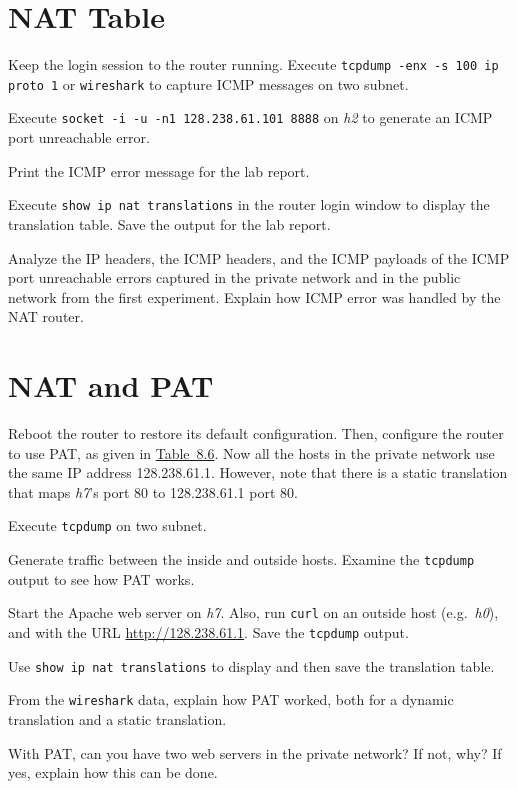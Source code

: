 \documentclass{../UTNetLab}
\begin{document}
\section{NAT Table}
    Keep the login session to the router running.
    Execute \lstinline{tcpdump -enx -s 100 ip proto 1} or \lstinline{wireshark} to capture ICMP messages on two subnet.

    Execute \lstinline{socket -i -u -n1 128.238.61.101 8888} on \textit{h2} to generate an ICMP port unreachable error.

    Print the ICMP error message for the lab report.

    Execute \lstinline[language=cisco]{show ip nat translations} in the router login window to display the translation table.
    Save the output for the lab report.

    \begin{report}
    \item Analyze the IP headers, the ICMP headers, and the ICMP payloads of the ICMP port unreachable errors captured in the private network and in the public network from the first experiment.
    Explain how ICMP error was handled by the NAT router.
    \end{report}

\section{NAT and PAT}
    Reboot the router to restore its default configuration.
    Then, configure the router to use PAT, as given in \hyperref[tab:8.6]{Table~8.6}.
    Now all the hosts in the private network use the same IP address 128.238.61.1.
    However, note that there is a static translation that maps \textit{h7}’s port 80 to 128.238.61.1 port 80.

    Execute \lstinline{tcpdump} on two subnet.

    Generate traffic between the inside and outside hosts.
    Examine the \lstinline{tcpdump} output to see how PAT works.

    Start the Apache web server on \textit{h7}.
    Also, run \lstinline[language=bash-ext]{curl} on an outside host (e.g.\ \textit{h0}), and with the URL \url{http://128.238.61.1}.
    Save the \lstinline{tcpdump} output.

    Use \lstinline[language={cisco}]{show ip nat translations} to display and then save the translation table.

    \begin{report}
    \item From the \lstinline{wireshark} data, explain how PAT worked, both for a dynamic translation and a static translation.
    
    \item With PAT, can you have two web servers in the private network?
    If not, why?
    If yes, explain how this can be done.
    \end{report}
\end{document}
